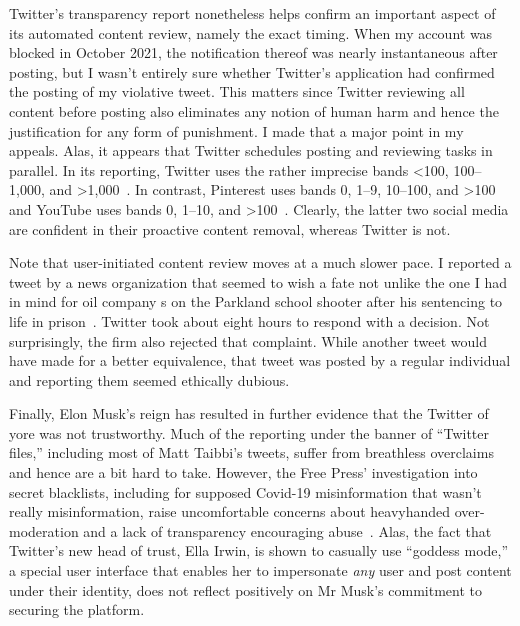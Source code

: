 Twitter's transparency report nonetheless helps confirm an important aspect of
its automated content review, namely the exact timing. When my account was
blocked in October 2021, the notification thereof was nearly instantaneous after
posting, but I wasn't entirely sure whether Twitter's application had confirmed
the posting of my violative tweet. This matters since Twitter reviewing all
content before posting also eliminates any notion of human harm and hence the
justification for any form of punishment. I made that a major point in my
appeals. Alas, it appears that Twitter schedules posting and reviewing tasks in
parallel. In its reporting, Twitter uses the rather imprecise bands <100,
100--1,000, and >1,000~\cite{Twitter2021}. In contrast, Pinterest uses bands 0,
1--9, 10--100, and >100~\cite{Pinterest2022} and YouTube uses bands 0, 1--10,
and >100~\cite{Google2022}. Clearly, the latter two social media are confident
in their proactive content removal, whereas Twitter is not.

Note that user-initiated content review moves at a much slower pace. I reported
a tweet by a news organization that seemed to wish a fate not unlike the one I
had in mind for oil company \CEO{}s on the Parkland school shooter after his
sentencing to life in prison~\cite{ShapiroDeliso2022}. Twitter took about eight
hours to respond with a decision. Not surprisingly, the firm also rejected that
complaint. While another tweet would have made for a better equivalence, that
tweet was posted by a regular individual and reporting them seemed ethically
dubious.

Finally, Elon Musk's reign has resulted in further evidence that the Twitter of
yore was not trustworthy. Much of the reporting under the banner of ``Twitter
files,'' including most of Matt Taibbi's tweets, suffer from breathless
overclaims and hence are a bit hard to take. However, the Free Press'
investigation into secret blacklists, including for supposed Covid-19
misinformation that wasn't really misinformation, raise uncomfortable concerns
about heavyhanded over-moderation and a lack of transparency encouraging
abuse~\cite{WeissShrierea2022,Zweig2022}. Alas, the fact that Twitter's new head
of trust, Ella Irwin, is shown to casually use ``goddess mode,'' a special user
interface that enables her to impersonate \emph{any} user and post content under
their identity, does not reflect positively on Mr Musk's commitment to securing
the platform.
